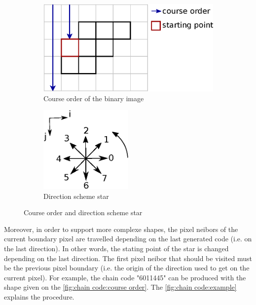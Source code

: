 \begin{figure}[H]
	\centering
	
  	\begin{subfigure}[b]{0.5\textwidth}
    	\includegraphics[width=\textwidth]{images/chain_code/course_order}
		\caption{Course order of the binary image \cite{bib:chain:ParametreGeometriqueChaineFreeman}}
		\label{fig:chain code:course order}	
  	\end{subfigure}
  	\begin{subfigure}[b]{0.4\textwidth}
  		\centering
    	\includegraphics[width=0.5\textwidth]{images/chain_code/direction_scheme_star}
    	\caption{Direction scheme star \cite{bib:chain:ParametreGeometriqueChaineFreeman}}
		\label{fig:chain code:direction scheme star}
  	\end{subfigure}
	
	\caption{Course order and direction scheme star}
\end{figure}




Moreover, in order to support more complexe shapes, the pixel neibors of the current boundary pixel are travelled depending on the last generated code (i.e. on the last direction). In other words, the stating point of the star is changed depending on the last direction. The first pixel neibor that should be visited must be the previous pixel boundary (i.e. the origin of the direction used to get on the current pixel). For example, the chain code "6011445" can be produced with the shape given on the \vref{fig:chain code:course order}. The \vref{fig:chain code:example} explains the procedure. 

